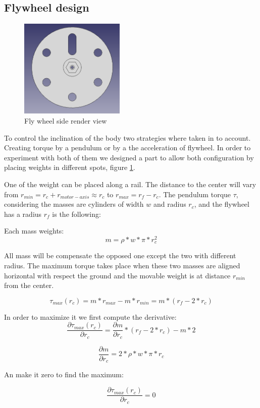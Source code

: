 \subsection{Flywheel design}
\begin{figure}
	\centering
	\includegraphics[width=5cm]{img/fly_wheel_side.png}
	\caption{Fly wheel side render view}
	\label{fig:Fly wheel side render view}
\end{figure}

To control the inclination of the body two strategies where taken in to account. Creating torque by a pendulum or by a the acceleration of flywheel. In order to experiment with both of them we designed a part to allow both configuration by placing weights in different spots, figure \ref{fig:Fly wheel side render view}.

One of the weight can be placed along a rail. The distance to the center will vary from $r_{min} = r_c + r_{motor-axis} \approx r_c $ to $r_{max} = r_f - r_c$. The pendulum torque $\tau$, considering the masses are cylinders of width $w$ and radius $r_c$, and the flywheel has a radius $r_f$ is the following:

Each mass weights:
\[ m = \rho * w * \pi * r_c^2 \]

All mass will be compensate the opposed one except the two with different radius.
The maximum torque takes place when these two masses are aligned horizontal with respect the ground and the movable weight is at distance $r_{min}$ from the center.

\[ \tau _{max} (r_c) = m * r_{max} - m * r_{min} = m * (r_f - 2 * r_c) \]

In order to maximize it we first compute the derivative:
\[\frac{\partial \tau _{max} (r_c)}{\partial r_c} = \frac{\partial m}{\partial r_c} * (r_f - 2 * r_c) - m * 2\]

\[ \frac{\partial m}{\partial r_c} = 2 * \rho * w * \pi *  r_c\]

An make it zero to find the maximum:

\[\frac{\partial \tau _{max} (r_c)}{\partial r_c} = 0\]

